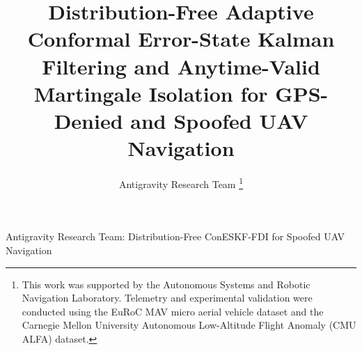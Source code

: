 \documentclass[journal,twocolumn]{IEEEtran}
\begin{document}
\title{Distribution-Free Adaptive Conformal Error-State Kalman Filtering and Anytime-Valid Martingale Isolation for GPS-Denied and Spoofed UAV Navigation}

\author{Antigravity Research Team%
\thanks{This work was supported by the Autonomous Systems and Robotic Navigation Laboratory. Telemetry and experimental validation were conducted using the EuRoC MAV micro aerial vehicle dataset and the Carnegie Mellon University Autonomous Low-Altitude Flight Anomaly (CMU ALFA) dataset.}%
}

%
{Antigravity Research Team: Distribution-Free ConESKF-FDI for Spoofed UAV Navigation}

\maketitle
\end{document}
